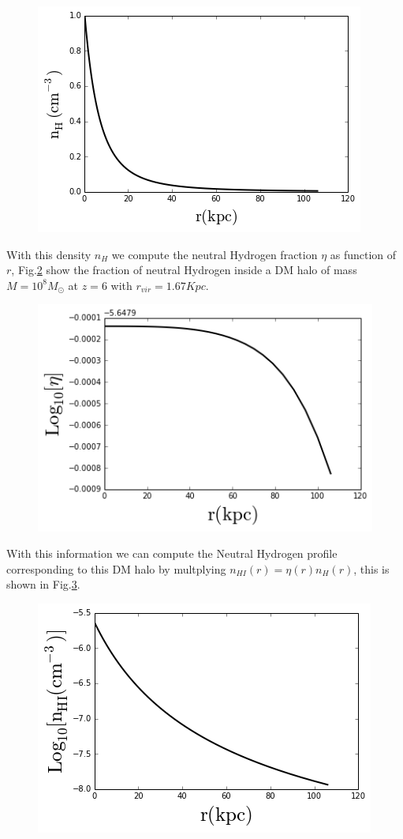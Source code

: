 \documentclass[12pt]{article}
\begin{document}
\begin{figure}[H]\label{fig:nhvsr}
\centering
\includegraphics[scale=0.7]{../code/nhvsr.png}
\end{figure} 

With this density $n_H$ we compute the neutral Hydrogen fraction $\eta$ as function of $r$, Fig.\ref{fig:etavsr}
show the fraction of neutral Hydrogen inside a DM halo of mass $M=10^8 M_{\odot}$ at $z=6$ with $r_{vir} = 1.67 Kpc$.

\begin{figure}[H]\label{fig:etavsr}
\centering
\includegraphics[scale=0.7]{../code/etavsr.png}
\end{figure}

With this information we can compute the Neutral Hydrogen profile corresponding to this DM halo by multplying
$n_{HI}(r) = \eta(r) n_{H}(r)$, this is shown in Fig.\ref{fig:nhivsr}.

\begin{figure}[H]\label{fig:nhivsr}
\centering
\includegraphics[scale=0.7]{../code/nhivsr.png}
\end{figure}  
\end{document}
